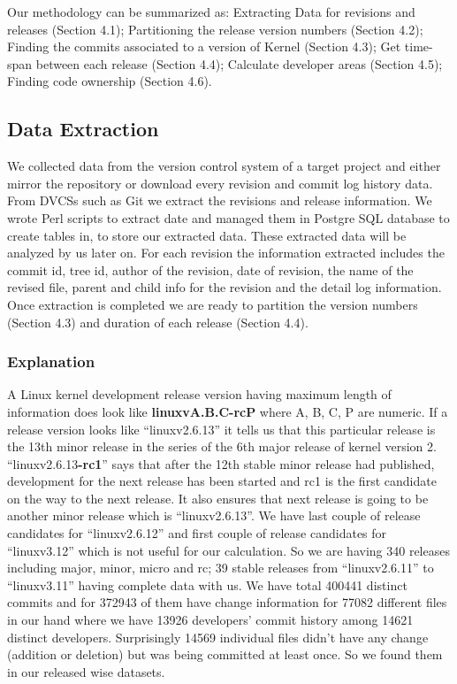 \documentclass{acm_proc_article-sp}
\begin{document}
Our methodology can be summarized as: Extracting Data for revisions and releases (Section 4.1); Partitioning the release version numbers (Section 4.2); Finding the commits associated to a version of Kernel (Section 4.3); Get time-span between each release (Section 4.4); Calculate developer areas (Section 4.5); Finding code ownership (Section 4.6).

\subsection{Data Extraction}
We collected data from the version control system of a target project and either mirror the repository or download every revision and commit log history data. From DVCSs such as Git we extract the revisions and release information. We wrote Perl scripts to extract date and managed them in Postgre SQL database to create tables in, to store our extracted data. These extracted data will be analyzed by us later on. For each revision the information extracted includes the commit id, tree id, author of the revision, date of revision, the name of the revised file, parent and child info for the revision and the detail log information. Once extraction is completed we are ready to partition the version numbers (Section 4.3) and duration  of each release (Section 4.4).

\subsubsection{Explanation}
A Linux kernel development release version having maximum length of information does look like \textbf{linuxvA.B.C-rcP} where A, B, C, P are numeric. If a release version looks like ``linuxv2.6.13'' it tells us that this particular release is the 13th minor release in the series of the 6th major release of kernel version 2. ``linuxv2.6.13\textbf{-rc1}'' says that after the 12th stable minor release had published, development for the next release has been started and rc1 is the first candidate on the way to the next release. It also ensures that next release is going to be another minor release which is ``linuxv2.6.13''. We have last couple of release candidates for ``linuxv2.6.12'' and first couple of release candidates for ``linuxv3.12'' which is not useful for our calculation. So we are having 340 releases including major, minor, micro and rc; 39 stable releases from ``linuxv2.6.11'' to ``linuxv3.11'' having complete data with us. We have total 400441 distinct commits and for 372943 of them have change information for 77082 different files in our hand where we have 13926 developers' commit history among 14621 distinct developers. Surprisingly 14569 individual files didn't have any change (addition or deletion) but was being committed at least once. So we found them in our released wise datasets.
\end{document}
